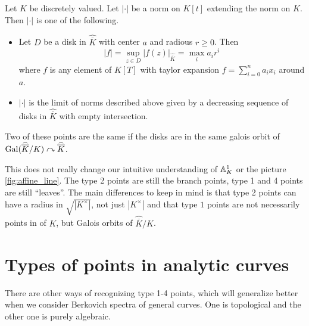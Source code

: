 \begin{proposition}
	Let $K$ be discretely valued. 
	Let $|\cdot |$ be a norm on $K[t]$ extending the norm on $K$. 
	Then $|\cdot |$ is one of the following.
	\begin{itemize}
		\item  Let $D$ be a disk in $\hat{\overline{K}}$ with center $a$ and radious $r  \ge 0$. 
			Then \[
				|f| = \sup_{z \in D} |f(z)|_{\hat{\overline{K}}} = \max_i a_i r^{i}
			\] 
			where $f$ is any element of $K[T]$ with taylor expansion $f = \sum_{i = 0}^{n} a_i x_i$ around $a$. 
		\item $|\cdot |$ is the limit of norms described above given by a decreasing sequence of disks in $\hat{\overline{K}}$ with empty intersection. 
	\end{itemize}
	Two of these points are the same if the disks are in the same galois orbit of $\operatorname{Gal}(\widehat{\overline{K}} / K) \curvearrowright \widehat{\overline{K}}$.  
\end{proposition}

This does not really change our intuitive understanding of $\mathbb{A}_{K}^{1}$ or the picture \cref{fig:affine_line}. 
The type 2 points are still the branch points, type 1 and 4 points are still ``leaves''.
The main differences to keep in mind is that type 2 points can have a radius in $\sqrt{|K^{\times }|} $, not just $|K^{\times }|$ and that type $1$ points are not necessarily points in of $K$, but Galois orbits of $\hat{\overline{K}} / K$. 




\section{Types of points in analytic curves} \label{sec:types_of_points_in_analytic_curves}
There are other ways of recognizing type 1-4 points, which will generalize better when we consider Berkovich spectra of general curves.
One is topological and the other one is purely algebraic. 


